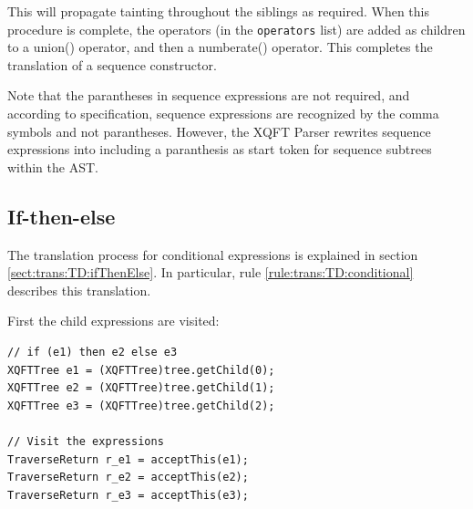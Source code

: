 %     
% 
%         
% 

This will propagate tainting throughout the siblings as required. When this
procedure is complete, the operators (in the \texttt{operators} list) are
added as children to a \textsf{union()} operator, and then a
\textsf{numberate()} operator. This completes the translation of a sequence
constructor.

Note that the parantheses in sequence expressions are not required, and
according to specification, sequence expressions are recognized by the comma
symbols and not parantheses. However, the XQFT Parser rewrites sequence
expressions into including a paranthesis as start token for sequence subtrees
within the AST.

\subsection{If-then-else}
The translation process for conditional expressions is explained in section
\ref{sect:trans:TD:ifThenElse}. In particular, rule
\ref{rule:trans:TD:conditional} describes this translation. 

First the child expressions are visited:

\begin{Verbatim}
// if (e1) then e2 else e3
XQFTTree e1 = (XQFTTree)tree.getChild(0); 
XQFTTree e2 = (XQFTTree)tree.getChild(1);
XQFTTree e3 = (XQFTTree)tree.getChild(2);
        
// Visit the expressions
TraverseReturn r_e1 = acceptThis(e1);
TraverseReturn r_e2 = acceptThis(e2);
TraverseReturn r_e3 = acceptThis(e3);
\end{Verbatim}

